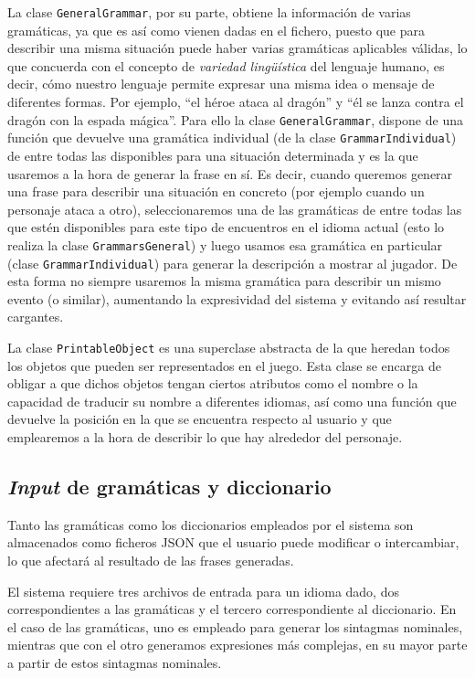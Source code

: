 La clase \texttt{GeneralGrammar}, por su parte, obtiene la información de varias gramáticas, ya que es así como vienen dadas en el fichero, puesto que para describir una misma situación puede haber varias gramáticas aplicables válidas, lo que concuerda con el concepto de \emph{variedad lingüística} del lenguaje humano,\cite{AraWeiBomKos2000a} es decir, cómo nuestro lenguaje permite expresar una misma idea o mensaje de diferentes formas. Por ejemplo, ``el héroe ataca al dragón'' y ``él se lanza contra el dragón con la espada mágica''. 
Para ello la clase \texttt{GeneralGrammar}, dispone de una función que devuelve una gramática individual (de la clase \texttt{GrammarIndividual}) de entre todas las disponibles para una situación determinada y es la que usaremos a la hora de generar la frase en sí. Es decir, cuando queremos generar una frase para describir una situación en concreto (por ejemplo cuando un personaje ataca a otro), seleccionaremos una de las gramáticas de entre todas las que estén disponibles para este tipo de encuentros en el idioma actual (esto lo realiza la clase \texttt{GrammarsGeneral}) y luego usamos esa gramática en particular (clase \texttt{GrammarIndividual}) para generar la descripción a mostrar al jugador. De esta forma no siempre usaremos la misma gramática para describir un mismo evento (o similar), aumentando la expresividad del sistema y evitando así resultar cargantes.

La clase \texttt{PrintableObject} es una superclase abstracta de la que heredan todos los objetos que pueden ser representados en el juego. Esta clase se encarga de obligar a que dichos objetos tengan ciertos atributos como el nombre o la capacidad de traducir su nombre a diferentes idiomas, así como una función que devuelve la posición en la que se encuentra respecto al usuario y que emplearemos a la hora de describir lo que hay alrededor del personaje.

\subsection{\textit{Input} de gramáticas y diccionario}

Tanto las gramáticas como los diccionarios empleados por el sistema son almacenados como ficheros JSON que el usuario puede modificar o intercambiar, lo que afectará al resultado de las frases generadas.

El sistema requiere tres archivos de entrada para un idioma dado, dos correspondientes a las gramáticas y el tercero correspondiente al diccionario. En el caso de las gramáticas, uno es empleado para generar los sintagmas nominales, mientras que con el otro generamos expresiones más complejas, en su mayor parte a partir de estos sintagmas nominales.

